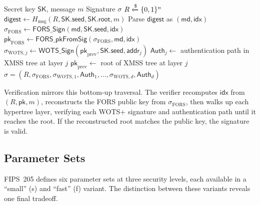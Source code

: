 \begin{algorithm}[t]
\caption{SLH-DSA Signing}
\label{alg:slh-sign}
\begin{algorithmic}[1]
\Require Secret key $\mathsf{SK}$, message $m$
\Ensure Signature $\sigma$
\State $R \getsr \{0,1\}^n$ 
\State $\mathsf{digest} \gets H_{\mathrm{msg}}(R, \mathsf{SK}.\mathsf{seed}, \mathsf{SK}.\mathsf{root}, m)$
\State Parse $\mathsf{digest}$ as $(\mathsf{md}, \mathsf{idx})$ 
\State $\sigma_{\mathrm{FORS}} \gets \textsf{FORS\_Sign}(\mathsf{md}, \mathsf{SK}.\mathsf{seed}, \mathsf{idx})$
\State $\mathsf{pk}_{\mathrm{FORS}} \gets \textsf{FORS\_pkFromSig}(\sigma_{\mathrm{FORS}}, \mathsf{md}, \mathsf{idx})$
 
  \State $\sigma_{\mathrm{WOTS},j} \gets \textsf{WOTS\_Sign}(\mathsf{pk}_{\mathrm{prev}}, \mathsf{SK}.\mathsf{seed}, \mathsf{addr}_j)$
  \State $\mathsf{Auth}_j \gets$ authentication path in XMSS tree at layer $j$
  \State $\mathsf{pk}_{\mathrm{prev}} \gets$ root of XMSS tree at layer $j$
\EndFor
\State \Return $\sigma = (R, \sigma_{\mathrm{FORS}}, \sigma_{\mathrm{WOTS},1}, \mathsf{Auth}_1, \ldots, \sigma_{\mathrm{WOTS},d}, \mathsf{Auth}_d)$
\end{algorithmic}
\end{algorithm}

Verification mirrors this bottom-up traversal.  The verifier recomputes $\mathsf{idx}$ from $(R, \mathsf{pk}, m)$, reconstructs the FORS public key from $\sigma_{\mathrm{FORS}}$, then walks up each hypertree layer, verifying each WOTS+ signature and authentication path until it reaches the root.  If the reconstructed root matches the public key, the signature is valid.

\subsection{Parameter Sets}
\label{subsec:slh-params}

FIPS~205 defines six parameter sets at three security levels, each available in a ``small'' (s) and ``fast'' (f) variant.  The distinction between these variants reveals one final tradeoff.

